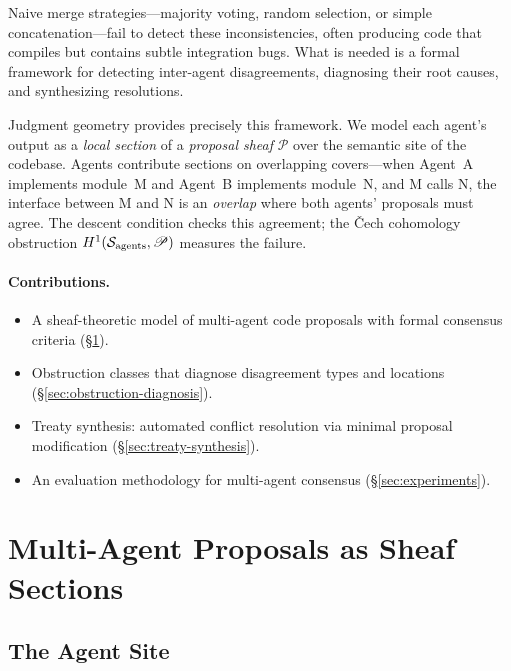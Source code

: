 \documentclass[11pt]{article}
\newcommand{\ProposalSheaf}{\mathscr{P}}
\newcommand{\AgentSite}{\mathcal{S}_{\mathrm{agents}}}
\begin{document}
Naive merge strategies---majority voting, random selection, or simple
concatenation---fail to detect these inconsistencies, often producing
code that compiles but contains subtle integration bugs.  What is
needed is a formal framework for detecting inter-agent disagreements,
diagnosing their root causes, and synthesizing resolutions.

Judgment geometry provides precisely this framework.  We model each
agent's output as a \emph{local section} of a \emph{proposal sheaf}
$\ProposalSheaf$ over the semantic site of the codebase.  Agents
contribute sections on overlapping covers---when Agent~A implements
module~M and Agent~B implements module~N, and M calls N, the
interface between M and N is an \emph{overlap} where both agents'
proposals must agree.  The descent condition checks this agreement;
the \v{C}ech cohomology obstruction $\Hcoh{1}(\AgentSite, \ProposalSheaf)$
measures the failure.

\paragraph{Contributions.}
\begin{itemize}
  \item A sheaf-theoretic model of multi-agent code proposals with
    formal consensus criteria (\S\ref{sec:agent-proposals}).
  \item Obstruction classes that diagnose disagreement types and
    locations (\S\ref{sec:obstruction-diagnosis}).
  \item Treaty synthesis: automated conflict resolution via minimal
    proposal modification (\S\ref{sec:treaty-synthesis}).
  \item An evaluation methodology for multi-agent consensus
    (\S\ref{sec:experiments}).
\end{itemize}


\section{Multi-Agent Proposals as Sheaf Sections}\label{sec:agent-proposals}

\subsection{The Agent Site}\label{subsec:agent-site}
\end{document}
